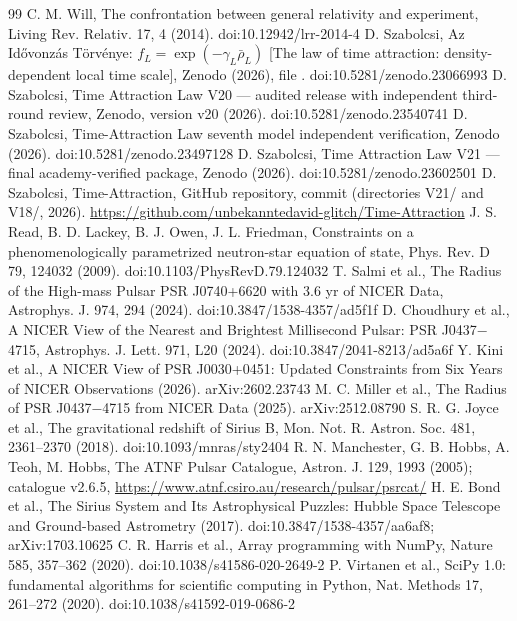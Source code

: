 \documentclass[11pt,a4paper]{article}
\begin{document}
\begin{thebibliography}{99}\small
{} C. M. Will, The confrontation between general relativity and experiment, Living Rev. Relativ. 17, 4
(2014). doi:10.12942/lrr-2014-4
 D. Szabolcsi, Az Id\H{o}vonz\'as T\"orv\'enye: $f_L=\exp(-\gamma_L\bar\rho_L)$ [The law of time
attraction: density-dependent local time scale], Zenodo (2026), file .
doi:10.5281/zenodo.23066993
 D. Szabolcsi, Time Attraction Law V20 --- audited release with independent third-round review,
Zenodo, version v20 (2026). doi:10.5281/zenodo.23540741
 D. Szabolcsi, Time-Attraction Law seventh model independent verification, Zenodo (2026).
doi:10.5281/zenodo.23497128
 D. Szabolcsi, Time Attraction Law V21 --- final academy-verified package, Zenodo (2026).
doi:10.5281/zenodo.23602501
 D. Szabolcsi, Time-Attraction, GitHub repository, commit \texttt{}
(directories V21/ and V18/, 2026). \url{https://github.com/unbekanntedavid-glitch/Time-Attraction}
 J. S. Read, B. D. Lackey, B. J. Owen, J. L. Friedman, Constraints on a phenomenologically
parametrized neutron-star equation of state, Phys. Rev. D 79, 124032 (2009). doi:10.1103/PhysRevD.79.124032
 T. Salmi et al., The Radius of the High-mass Pulsar PSR J0740+6620 with 3.6 yr of NICER Data,
Astrophys. J. 974, 294 (2024). doi:10.3847/1538-4357/ad5f1f
 D. Choudhury et al., A NICER View of the Nearest and Brightest Millisecond Pulsar:
PSR J0437$-$4715, Astrophys. J. Lett. 971, L20 (2024). doi:10.3847/2041-8213/ad5a6f
 Y. Kini et al., A NICER View of PSR J0030+0451: Updated Constraints from Six Years of NICER
Observations (2026). arXiv:2602.23743
 M. C. Miller et al., The Radius of PSR J0437$-$4715 from NICER Data (2025). arXiv:2512.08790
 S. R. G. Joyce et al., The gravitational redshift of Sirius B, Mon. Not. R. Astron. Soc. 481,
2361--2370 (2018). doi:10.1093/mnras/sty2404
 R. N. Manchester, G. B. Hobbs, A. Teoh, M. Hobbs, The ATNF Pulsar Catalogue, Astron. J. 129, 1993
(2005); catalogue v2.6.5, \url{https://www.atnf.csiro.au/research/pulsar/psrcat/}
 H. E. Bond et al., The Sirius System and Its Astrophysical Puzzles: Hubble Space Telescope and
Ground-based Astrometry (2017). doi:10.3847/1538-4357/aa6af8; arXiv:1703.10625
 C. R. Harris et al., Array programming with NumPy, Nature 585, 357--362 (2020).
doi:10.1038/s41586-020-2649-2
 P. Virtanen et al., SciPy 1.0: fundamental algorithms for scientific computing in Python, Nat.
Methods 17, 261--272 (2020). doi:10.1038/s41592-019-0686-2
\end{thebibliography}
\end{document}

